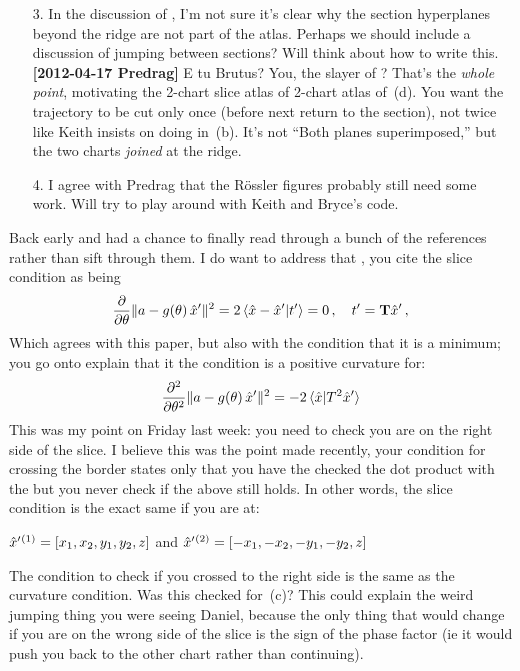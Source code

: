 \begin{description}
\begin{itemize}
		\item[3.] In the discussion of , I'm not
        sure it's clear why 		the section hyperplanes beyond the
        ridge are not part of the atlas. Perhaps we 		should
        include a discussion of jumping between sections? Will think
        about how 		to write this.
        \\{\bf [2012-04-17 Predrag]} E tu Brutus? You, the slayer of \cLe?
        That's the \emph{whole point}, motivating the 2-chart slice atlas
        of 2-chart atlas of \,(d). You want the
        trajectory to be cut only once (before next return to the
        section), not twice like Keith insists on doing in
        \,(b). It's not ``Both planes
        superimposed,'' but the two charts \emph{joined } at the ridge.

		\item[4.] I agree with Predrag that the R\"ossler figures probably still need some work.
		Will try to play around with Keith and Bryce's code.
	\end{itemize}

\item[2012-04-17 Keith]  Back early and had a chance to finally read
through a bunch of the references rather than sift through them.  I do
want to address that , you cite the slice condition as
being
\[
\frac{\partial}{\partial \gSpace} \Norm{\ssp - \LieEl(\gSpace)\,\slicep}^2
   =
2\, \braket{\sspRed - \slicep}{\sliceTan{}}
   = 0
        \,,\quad
\sliceTan{} = \Lg \slicep
\,,
\]
Which agrees with this paper, but also with the condition that it is a
minimum; you go onto explain that it the condition is a positive
curvature for:
\[
\frac{\partial^2}{\partial \gSpace^2} \Norm{\ssp - \LieEl(\gSpace)\,\slicep}^2
   =
-2\, \braket{\sspRed}{T^2 \slicep}
\]
This was my point on Friday last week: you need to check you are on the
right side of the slice.  I believe this was the point made recently,
your condition for crossing the border states only that you have the
checked the dot product with the \sliceTan{} but you never check if the
above still holds.  In other words, the slice condition is the exact same
if you are at:

${\hat{x}'}{}^{(1)} = [x_{1}, x_{2}, y_{1}, y_{2}, z]$
and
${\hat{x}'}{}^{(2)} = [-x_{1}, -x_{2}, -y_{1}, -y_{2}, z]$

The condition to check if you crossed to the right side is the same as
the curvature condition.  Was this checked for \,(c)?
This could explain the weird jumping thing you were seeing Daniel,
because the only thing that would change if you are on the wrong side of
the slice is the sign of the phase factor (ie it would push you back to
the other chart rather than continuing).


\end{description}
